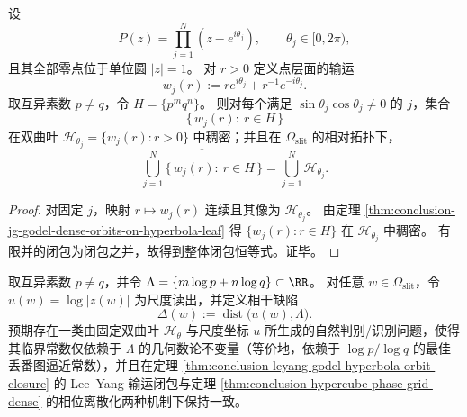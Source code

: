 \begin{theorem}\label{thm:conclusion-leyang-godel-hyperbola-orbit-closure}
设
\[
P(z)=\prod_{j=1}^{N}(z-e^{i\theta_j}),\qquad \theta_j\in[0,2\pi),
\]
且其全部零点位于单位圆 \(|z|=1\)。
对 \(r>0\) 定义点层面的输运
\[
w_j(r):=r e^{i\theta_j}+r^{-1}e^{-i\theta_j}.
\]
取互异素数 \(p\neq q\)，令 \(H=\{p^{m}q^{n}\}\)。
则对每个满足 \(\sin\theta_j\cos\theta_j\neq 0\) 的 \(j\)，集合
\[
\{\,w_j(r):\ r\in H\,\}
\]
在双曲叶
\(
\mathcal H_{\theta_j}=\{w_j(r):r>0\}
\)
中稠密；并且在 \(\Omega_{\mathrm{slit}}\) 的相对拓扑下，
\[
\overline{\bigcup_{j=1}^{N}\{\,w_j(r):\ r\in H\,\}}
=\bigcup_{j=1}^{N}\mathcal H_{\theta_j}.
\]
\end{theorem}
\begin{proof}
对固定 \(j\)，映射 \(r\mapsto w_j(r)\) 连续且其像为 \(\mathcal H_{\theta_j}\)。
由定理 \ref{thm:conclusion-jg-godel-dense-orbits-on-hyperbola-leaf} 得 \(\{w_j(r):r\in H\}\) 在 \(\mathcal H_{\theta_j}\) 中稠密。
有限并的闭包为闭包之并，故得到整体闭包恒等式。证毕。
\end{proof}

\begin{conjecture}[对数素数格的最短向量控制相干阈值]\label{conj:conclusion-jg-godel-coherence-threshold-short-vector}
取互异素数 \(p\neq q\)，并令 \(\Lambda=\{m\log p+n\log q\}\subset\RR\)。
对任意 \(w\in\Omega_{\mathrm{slit}}\)，令 \(u(w)=\log|z(w)|\) 为尺度读出，并定义相干缺陷
\[
\Delta(w):=\operatorname{dist}\bigl(u(w),\Lambda\bigr).
\]
预期存在一类由固定双曲叶 \(\mathcal H_\theta\) 与尺度坐标 \(u\) 所生成的自然判别/识别问题，使得其临界常数仅依赖于 \(\Lambda\) 的几何数论不变量（等价地，依赖于 \(\log p/\log q\) 的最佳丢番图逼近常数），并且在定理 \ref{thm:conclusion-leyang-godel-hyperbola-orbit-closure} 的 Lee--Yang 输运闭包与定理 \ref{thm:conclusion-hypercube-phase-grid-dense} 的相位离散化两种机制下保持一致。
\end{conjecture}

